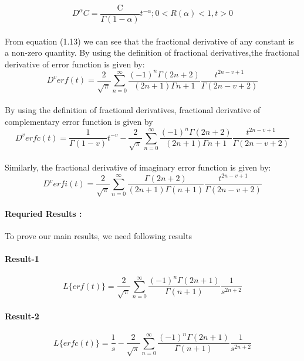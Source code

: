 \documentclass{article}
\begin{document}
\begin{equation}
    D^{\alpha}C = 
    \frac{\text{C}}{\Gamma{(1-\alpha)}}
    t^{- \alpha};
    0 < R(\alpha) < 1,
    t > 0
\end{equation}\\ 
From equation (1.13) we can see that the fractional derivative of any constant is a non-zero quantity.
By using the definition of fractional derivatives,the fractional derivative of error function is given by:
\begin{equation}
    D^v erf(t) = 
    \frac{2}{\sqrt{\pi}}
    \sum_{n = 0}^{\infty}
    \frac{{(-1)}^n\Gamma{(2n+2)}}{(2n+1)\Gamma{n+1}}
    \frac{t^{2n-v+1}}{\Gamma{(2n-v+2)}}
\end{equation}\\ 
By using the definition of fractional derivatives, fractional derivative of complementary error function is given by\\ 
\begin{equation}
    D^v erfc(t) = 
    \frac{1}{\Gamma(1 - v)}
    t^{-v}-
    \frac{2}{\sqrt{\pi}}
    \sum_{n = 0}^{\infty}
    \frac{{(-1)}^n\Gamma{(2n+2)}}{(2n+1)\Gamma{n+1}}
    \frac{t^{2n-v+1}}{\Gamma{(2n-v+2)}}
\end{equation}
\\ 
Similarly, the fractional derivative of imaginary error function is given by:
\\ 
\begin{equation}
    D^v erfi(t) = 
    \frac{2}{\sqrt{\pi}}
    \sum_{n = 0}^{\infty}
    \frac{{\Gamma{(2n+2)}}}{(2n+1)\Gamma{(n+1)}}
    \frac{t^{2n-v+1}}{\Gamma{(2n-v+2)}}
\end{equation}
\paragraph{Requried Results :\\}
    To prove our main results, we need following results
\paragraph{Result-1}
\begin{equation}
    L \big\{ erf(t) \big\} = 
    \frac{2}{\sqrt{\pi}}
    \sum_{n = 0}^{\infty}
    \frac{{(-1)}^n\Gamma{(2n+1)}}{\Gamma{(n+1)}}
    \frac{1}{s^{2n+2}}
\end{equation}
\paragraph{Result-2}
\begin{equation}
    L \big\{ erfc(t) \big\} = 
    \frac{1}{s}-
    \frac{2}{\sqrt{\pi}}
    \sum_{n = 0}^{\infty}
    \frac{{(-1)}^n\Gamma{(2n+1)}}{\Gamma{(n+1)}}
    \frac{1}{s^{2n+2}}
\end{equation}
\end{document}
